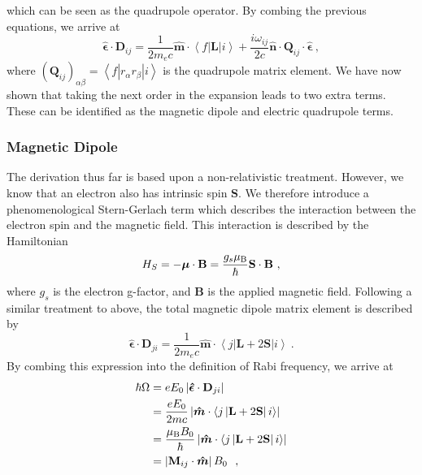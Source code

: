 \documentclass{article}
\begin{document}
which can be seen as the quadrupole operator. By combing the previous equations, we arrive at 
\begin{equation}
    \boldsymbol{\hat{\epsilon}}\cdot\mathbf{D}_{ij} = \frac{1}{2m_e c} \boldsymbol{\hat{m}}\cdot \left\langle f \left|\mathbf{L} \right| i \right\rangle + \frac{i\omega_{ij}}{2c}\boldsymbol{\hat{n}}\cdot\mathbf{Q}_{ij}\cdot \boldsymbol{\hat{\epsilon}}~,    
\end{equation}
where $\left(\mathbf{Q}_{ij}\right)_{\alpha\beta} =  \left\langle f \left|r_{\alpha} r_{\beta} \right| i \right\rangle$ is the quadrupole matrix element. We have now shown that taking the next order in the expansion leads to two extra terms. These can be identified as the magnetic dipole and electric quadrupole terms.

\subsubsection{Magnetic Dipole}
The derivation thus far is based upon a non-relativistic treatment. However, we know that an electron also has intrinsic spin $\mathbf{S}$. We therefore introduce a phenomenological Stern-Gerlach term which describes the interaction between the electron spin and the magnetic field. This interaction is described by the Hamiltonian
\begin{equation}
     H_S = -\boldsymbol{\mu}\cdot\mathbf{B} = \frac{g_s \mu_{\rm{B}}}{\hbar}\mathbf{S}\cdot\mathbf{B}~,
\end{equation}
where $g_s$ is the electron g-factor, and $\mathbf{B}$ is the applied magnetic field. Following a similar treatment to above, the total magnetic dipole matrix element is described by  
\begin{equation}
    \boldsymbol{\hat{\epsilon}}\cdot\mathbf{D}_{ji} = \frac{1}{2m_ec}\boldsymbol{\hat{m}}\cdot \left\langle j \left|\mathbf{L} + 2\mathbf{S} \right| i \right\rangle~.
\end{equation}
By combing this expression into the definition of Rabi frequency, we arrive at 
\begin{align}
    \hbar \Omega &= e E_0 \left|\boldsymbol{\hat{\epsilon}}\cdot\mathbf{D}_{ji}\right| \\
    &= \frac{eE_0}{2mc}\left|\boldsymbol{\hat{m}}\cdot \left\langle j \left|\mathbf{L} + 2\mathbf{S} \right| i \right\rangle\right| \\
    &=\frac{\mu_{\rm{B}}B_0}{\hbar}\left|\boldsymbol{\hat{m}}\cdot \left\langle j \left|\mathbf{L} + 2\mathbf{S} \right| i \right\rangle\right| \\
    &= \left|\mathbf{M}_{ij} \cdot \boldsymbol{\hat{m}} \right|B_0~~,
\end{align}
\end{document}
